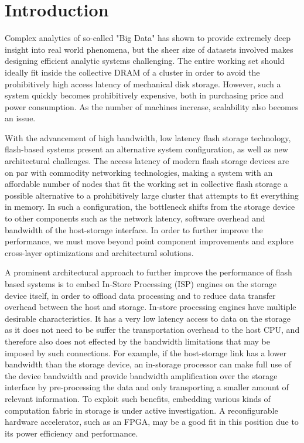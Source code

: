\section{Introduction}

Complex analytics of so-called "Big Data" has shown to provide extremely deep
insight into real world phenomena, but the sheer size of datasets involved makes
designing efficient analytic systems challenging. The entire working set should
ideally fit inside the collective DRAM of a cluster in order to avoid the
prohibitively high access latency of mechanical disk storage. However, such a
system quickly becomes prohibitively expensive, both in purchasing price and
power consumption. As the number of machines increase, scalability also becomes
an issue.

With the advancement of high bandwidth, low latency flash
storage technology, flash-based systems present an alternative system
configuration, as well as new architectural challenges. The access latency of
modern flash storage devices are on par with commodity networking
technologies, making a system with an affordable number of nodes that fit the working
set in collective flash storage a possible alternative to a prohibitively large cluster that
attempts to fit everything in memory. 
In such a configuration, the bottleneck shifts from the storage device to
other components such as the network latency, software overhead and bandwidth of
the host-storage interface. In order to further improve the performance,
we must move beyond point component improvements and explore cross-layer
optimizations and architectural solutions.

A prominent architectural approach to further improve the performance of flash
based systems is to embed In-Store Processing (ISP) engines on the storage
device itself, in order to offload data processing and to reduce data transfer
overhead between the host and storage. In-store processing engines have multiple
desirable characteristics. It has a very low latency access to data on the
storage as it does not need to be suffer the transportation overhead to the
host CPU, and therefore also does not effected by the bandwidth limitations that
may be imposed by such connections. For example, if the host-storage link has a
lower bandwidth than the storage device, an in-storage processor can make full
use of the device bandwidth and provide bandwidth amplification over the storage
interface by pre-processing the data and only transporting a smaller amount of
relevant information. To exploit such benefits, embedding various kinds
of computation fabric in storage is under active investigation. A reconfigurable
hardware accelerator, such as an FPGA, may be a good fit in this position due
to its power efficiency and performance.

